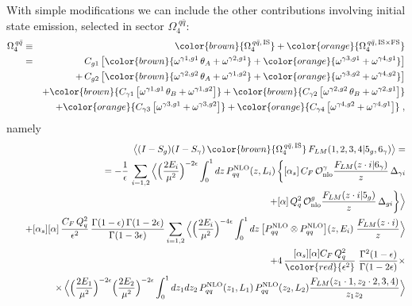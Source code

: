 \documentclass[12pt,a4paper]{article}
\newcommand{\nn}{\nonumber}
\newcommand{\eps}{\epsilon}
\newcommand{\beq}{\begin{eqnarray}}
\newcommand{\eeq}{\end{eqnarray}}
\begin{document}
\noindent
With simple modifications we can include the other contributions involving initial state emission, selected in sector $\Omega^{\; q\bar{q}}_4$:
\beq
\Omega^{\, q\bar{q}}_4 &\equiv&
{\color{brown}{\Omega^{\, q\bar{q}, \, \rm IS}_4}}
+
{\color{orange}{
\Omega^{\, q\bar{q}, \, \rm IS\times FS}_4}}
\nn \\
&=&
C_{g1} \, 
\big[
{\color{brown}{ \omega^{\gamma1,g1}  \, \theta_A 
+  \omega^{\gamma2,g1} 
}}
+ 
{\color{orange}{ \omega^{\gamma3,g1} 
+  \omega^{\gamma4,g1} 
}}
\big]
\nn \\
&&
+ \, C_{g2} \, 
\big[ 
{\color{brown}{\omega^{\gamma2,g2}  \, \theta_A 
+  \omega^{\gamma1,g2}
}}
+ 
{\color{orange}{ \omega^{\gamma3,g2}
+  \omega^{\gamma4,g2}
}}
 \big]
\nn \\
&& 
+ 
{\color{brown}{
C_{\gamma1} \, 
\big[ \omega^{\gamma1,g1}  \, \theta_B 
+  \omega^{\gamma1,g2} \big]
}}
+ 
{\color{brown}{
C_{\gamma2} \, 
\big[ \omega^{\gamma2,g2}  \, \theta_B 
+  \omega^{\gamma2,g1} \big] 
}}
\nn \\
&&
+
{\color{orange}{ C_{\gamma3} \, 
\big[ \omega^{\gamma3,g1} 
+  \omega^{\gamma3,g2} \big]
}}
+
{\color{orange}{ C_{\gamma4} \, 
\big[ \omega^{\gamma4,g2} 
+  \omega^{\gamma4,g1} \big]
}}
 \; ,
\eeq
namely
\beq
&&
\big\langle 
(I-S_g) (I-S_\gamma)   \, 
{\color{brown}{\Omega^{\, q\bar{q}, \, \rm IS}_4}} \, 
F_{LM}(1,2,3,4|5_g,6_\gamma)
\big\rangle = 
\nn \\
&& =
- \frac{1}\eps \, 
\sum_{i=1,2}
\Big\langle
\Big(\frac{2 E_i}{\mu^2}\Big)^{-2\eps}
\int_0^1 dz \, P_{qq}^{\rm NLO}(z,L_i) \, 
\bigg\{
[\alpha_s] \, C_F \, \mathcal{O}_{\rm nlo}^\gamma 
\frac{F_{LM}(z\cdot i | 6_\gamma)}{z} \, 
\Delta_{\gamma i}
\nn \\
&& \qquad \qquad \qquad 
+
[\alpha] \, Q_q^2 \,
\mathcal{O}_{\rm nlo}^g
\frac{F_{LM}(z\cdot i | 5_g)}{z} \, 
\Delta_{g i}
\bigg\}
\Big\rangle
\nn \\
&&
\quad 
+
[\alpha_s] [\alpha] \, \frac{C_F \, Q_q^2}{\eps^2} \, 
 \frac{\Gamma(1-\eps) \, \Gamma(1-2\eps)}{\Gamma(1-3\eps)} 
 \sum_{i=1,2}
\Big\langle
 \Big(\frac{2E_i}{\mu^2}\Big)^{-4\eps}
\int_0^1 dz \, 
\big[P_{qq}^{\rm NLO}
\otimes
P_{qq}^{\rm NLO}
\big] (z, E_i) \; 
\frac{F_{LM}(z \cdot i)}{z} 
\Big\rangle
\nn \\
&& \quad 
+ 4 \, \frac{ [\alpha_s] [\alpha]  C_F \, Q_q^2}{{\color{red}{\eps^2}}} \; 
\frac{\Gamma^2(1-\eps)}{\Gamma(1-2\eps)} \times
\\ \nn
&& \quad  \qquad \times \, 
\Big\langle
\Big(\frac{2 E_1}{\mu^2}\Big)^{-2\eps}
\Big(\frac{2 E_2}{\mu^2}\Big)^{-2\eps}
\int_0^1 dz_1 dz_2 \, P_{qq}^{\rm NLO}(z_1,L_1) \, 
P_{qq}^{\rm NLO}(z_2,L_2) 
\frac{F_{LM}(z_1\cdot 1, z_2 \cdot 2, 3, 4)}{z_1 z_2}
\Big\rangle
\eeq
\end{document}

